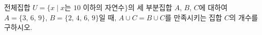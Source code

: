 전체집합 $U=\{x \mid x$는 $10$ 이하의 자연수$\}$의 세 부분집합 $A$, $B$, $C$에 대하여 $A=\{3,\,6,\,9\}$, $B=\{2,\,4,\,6,\,9\}$일 때, $A\cup C=B\cup C$를 만족시키는 집합 $C$의 개수를 구하시오.
